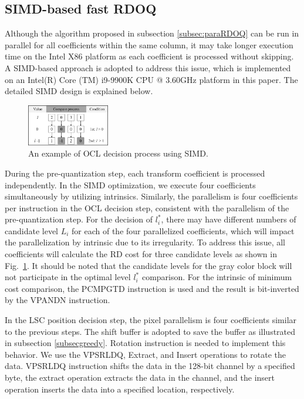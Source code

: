 \documentclass[lettersize,journal]{IEEEtran}
\begin{document}
\subsection{SIMD-based fast RDOQ} 
\label{subsec:3D}
Although the algorithm proposed in subsection \ref{subsec:paraRDOQ} can be run in parallel for all coefficients within the same column, it may take longer execution time on the Intel X86 platform as each coefficient is processed without skipping.
A SIMD-based approach is adopted to address this issue, which is implemented on an Intel(R) Core (TM) i9-9900K CPU @ 3.60GHz platform in this paper. The detailed SIMD design is explained below.

\begin{figure}[!t]
	\centering
	\centerline{\includegraphics[width=0.32\textwidth]{figure/SIMDSEL.png}} 
	\caption{An example of OCL decision process using SIMD.}
	\label{selection} %
\end{figure}
During the pre-quantization step, each transform coefficient is processed independently. In the SIMD optimization, we execute four coefficients simultaneously by utilizing intrinsics. Similarly, the parallelism is four coefficients per instruction in the OCL decision step, consistent with the parallelism of the pre-quantization step. For the decision of $l_{i}^{*}$, there may have different numbers of candidate level $L_{i}$ for each of the four parallelized coefficients, which will impact the parallelization by intrinsic due to its irregularity. To address this issue, all coefficients will calculate the RD cost for three candidate levels as shown in Fig.~\ref{selection}. It should be noted that the candidate levels for the gray color block will not participate in the optimal level $l_{i}^{*}$ comparison. For the intrinsic of minimum cost comparison, the PCMPGTD instruction is used and the result is bit-inverted by the VPANDN instruction.
\par
In the LSC position decision step, the pixel parallelism is four coefficients similar to the previous steps. The shift buffer is adopted to save the buffer as illustrated in subsection \ref{subsecgreedy}. Rotation instruction is needed to implement this behavior. We use the VPSRLDQ, Extract, and Insert operations to rotate the data. VPSRLDQ instruction shifts the data in the 128-bit channel by a specified byte, the extract operation extracts the data in the channel, and the insert operation inserts the data into a specified location, respectively. 
\end{document}
